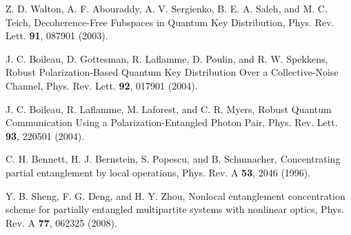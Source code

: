 \documentclass[showpacs,aps,graphicx,twocolumn]{revtex4}
\begin{document}
\begin{thebibliography}{1}
  Z. D. Walton, A. F. Abouraddy, A. V. Sergienko,
B. E. A. Saleh, and M. C. Teich, Decoherence-Free Fubspaces in Quantum Key Distribution,
Phys. Rev. Lett. \textbf{91}, 087901 (2003).


 J. C. Boileau, D. Gottesman, R. Laflamme, D. Poulin,
and R. W. Spekkens, Robust Polarization-Based Quantum Key Distribution
Over a Collective-Noise Channel, Phys. Rev. Lett. \textbf{92}, 017901 (2004).


 J. C. Boileau, R. Laflamme, M. Laforest, and C. R. Myers,
Robust Quantum Communication Using a Polarization-Entangled Photon Pair,
Phys. Rev. Lett. \textbf{93}, 220501 (2004).









 C. H. Bennett, H. J. Bernstein, S. Popescu, and B. Schumacher,
Concentrating partial entanglement by local operations, Phys. Rev. A \textbf{53}, 2046 (1996).

%



 Y. B. Sheng, F. G. Deng, and H. Y. Zhou,
Nonlocal entanglement concentration scheme for partially entangled
multipartite systems with nonlinear optics, Phys. Rev. A
\textbf{77}, 062325 (2008).




%


%
%
%
%


\end{thebibliography}
\end{document}
